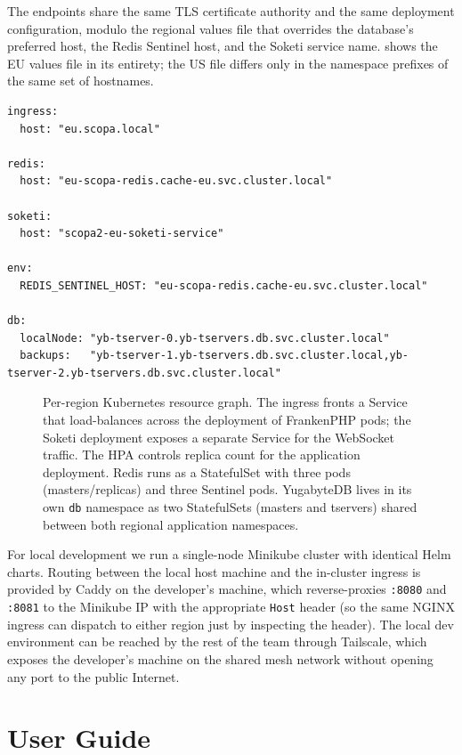 \documentclass{scrartcl}
\newcommand{\figtikz}[2]{%
    \begin{figure}
        \centering
        \resizebox{\textwidth}{!}{}
        \caption{#2}
        \label{fig:#1}
    \end{figure}%
}
\begin{document}
The endpoints share the same TLS certificate authority and the same
deployment configuration, modulo the regional values file that
overrides the database's preferred host, the Redis Sentinel host, and
the Soketi service name.  shows the EU values file
in its entirety; the US file differs only in the namespace prefixes
of the same set of hostnames.

\begin{lstlisting}[caption={Helm values overrides for
the EU region. Every other configuration parameter is inherited from
the shared \texttt{values.yaml}.},label={lst:helm-eu}]
ingress:
  host: "eu.scopa.local"

redis:
  host: "eu-scopa-redis.cache-eu.svc.cluster.local"

soketi:
  host: "scopa2-eu-soketi-service"

env:
  REDIS_SENTINEL_HOST: "eu-scopa-redis.cache-eu.svc.cluster.local"

db:
  localNode: "yb-tserver-0.yb-tservers.db.svc.cluster.local"
  backups:   "yb-tserver-1.yb-tservers.db.svc.cluster.local,yb-tserver-2.yb-tservers.db.svc.cluster.local"
\end{lstlisting}

\figtikz{deployment}{Per-region Kubernetes resource graph. The
ingress fronts a Service that load-balances across the deployment of
FrankenPHP pods; the Soketi deployment exposes a separate Service for
the WebSocket traffic. The HPA controls replica count for the
application deployment. Redis runs as a StatefulSet with three pods
(masters/replicas) and three Sentinel pods. YugabyteDB lives in its
own \texttt{db} namespace as two StatefulSets (masters and tservers)
shared between both regional application namespaces.}

For local development we run a single-node Minikube cluster with
identical Helm charts. Routing between the local host machine and the
in-cluster ingress is provided by Caddy on the developer's machine,
which reverse-proxies \texttt{:8080} and \texttt{:8081} to the
Minikube IP with the appropriate \texttt{Host} header (so the same
NGINX ingress can dispatch to either region just by inspecting the
header). The local dev environment can be reached by the rest of the
team through Tailscale, which exposes the developer's machine on the
shared mesh network without opening any port to the public Internet.

\section{User Guide}\label{user-guide}
\end{document}

